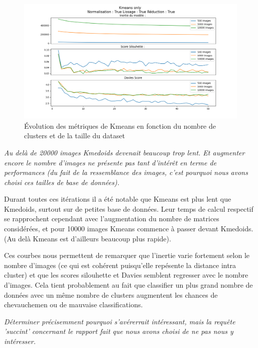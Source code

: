 \documentclass{article}
\begin{document}
\begin{figure}[H]
    \centering
    \includegraphics[width=\textwidth]{"./Images/Kmeans_no_prepro.png"}
    \caption{Évolution des métriques de Kmeans en fonction du nombre de clusters et de la taille du dataset}
    \label{fig:my_label}
\end{figure}


\textit{Au delà de 20000 images Kmedoids devenait beaucoup trop lent. Et augmenter encore le nombre d'images ne présente pas tant d'intérêt en terme de performances (du fait de la ressemblance des images, c'est pourquoi nous avons choisi ces tailles de base de données).}

\vspace{3mm}

Durant toutes ces itérations il a été notable que Kmeans est plus lent que Kmedoids, surtout sur de petites base de données. Leur temps de calcul respectif se rapprochent cependant avec l'augmentation du nombre de matrices considérées, et pour 10000 images Kmeans commence à passer devant Kmedoids. (Au delà Kmeans est d'ailleurs beaucoup plus rapide).

Ces courbes nous permettent de remarquer que l'inertie varie fortement selon le nombre d'images (ce qui est cohérent puisqu'elle repésente la distance intra cluster) et que les scores silouhette et Davies semblent regresser avec le nombre d'images. Cela tient probablement au fait que classifier un plus grand nombre de données avec un même nombre de clusters augmentent les chances de chevauchemen ou de mauvaise classifications.
\vspace{2mm}

\textit{Déterminer précisemment pourquoi s'avérerrait intéressant, mais la requête 'succint' concernant le rapport fait que nous avons choisi de ne pas nous y intéresser.}
\end{document}

